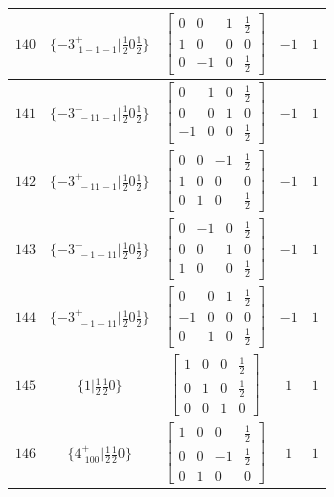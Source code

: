 \documentclass[fleqn,8pt]{jsarticle}
\begin{document}
\begin{longtable}{ccccc}
$ 140 $ & $ \{-3^{+}_{\,\,1-1-1}|\frac{1}{2} 0 \frac{1}{2}\} $ & $ \begin{bmatrix} 0 & 0 & 1 & \frac{1}{2} \\ 1 & 0 & 0 & 0 \\ 0 & -1 & 0 & \frac{1}{2} \end{bmatrix} $ & $ -1 $ & $ 1 $ \\ \hline
$ 141 $ & $ \{-3^{-}_{\,\,-11-1}|\frac{1}{2} 0 \frac{1}{2}\} $ & $ \begin{bmatrix} 0 & 1 & 0 & \frac{1}{2} \\ 0 & 0 & 1 & 0 \\ -1 & 0 & 0 & \frac{1}{2} \end{bmatrix} $ & $ -1 $ & $ 1 $ \\ \hline
$ 142 $ & $ \{-3^{+}_{\,\,-11-1}|\frac{1}{2} 0 \frac{1}{2}\} $ & $ \begin{bmatrix} 0 & 0 & -1 & \frac{1}{2} \\ 1 & 0 & 0 & 0 \\ 0 & 1 & 0 & \frac{1}{2} \end{bmatrix} $ & $ -1 $ & $ 1 $ \\ \hline
$ 143 $ & $ \{-3^{-}_{\,\,-1-11}|\frac{1}{2} 0 \frac{1}{2}\} $ & $ \begin{bmatrix} 0 & -1 & 0 & \frac{1}{2} \\ 0 & 0 & 1 & 0 \\ 1 & 0 & 0 & \frac{1}{2} \end{bmatrix} $ & $ -1 $ & $ 1 $ \\ \hline
$ 144 $ & $ \{-3^{+}_{\,\,-1-11}|\frac{1}{2} 0 \frac{1}{2}\} $ & $ \begin{bmatrix} 0 & 0 & 1 & \frac{1}{2} \\ -1 & 0 & 0 & 0 \\ 0 & 1 & 0 & \frac{1}{2} \end{bmatrix} $ & $ -1 $ & $ 1 $ \\ \hline
$ 145 $ & $ \{1|\frac{1}{2} \frac{1}{2} 0\} $ & $ \begin{bmatrix} 1 & 0 & 0 & \frac{1}{2} \\ 0 & 1 & 0 & \frac{1}{2} \\ 0 & 0 & 1 & 0 \end{bmatrix} $ & $ 1 $ & $ 1 $ \\ \hline
$ 146 $ & $ \{4^{+}_{\,\,100}|\frac{1}{2} \frac{1}{2} 0\} $ & $ \begin{bmatrix} 1 & 0 & 0 & \frac{1}{2} \\ 0 & 0 & -1 & \frac{1}{2} \\ 0 & 1 & 0 & 0 \end{bmatrix} $ & $ 1 $ & $ 1 $ \\ \hline

\end{longtable}
\end{document}
